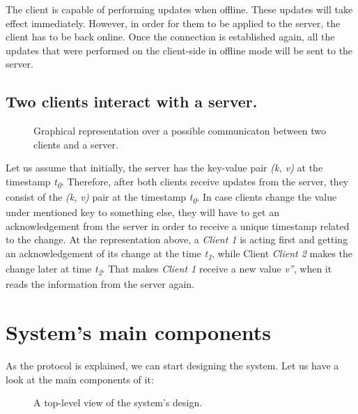 The client is capable of performing updates when offline. These updates will take effect immediately. However, in order for them to be applied to the server, the client has to be back online. Once the connection is established again, all the updates that were performed on the client-side in offline mode will be sent to the server.

\subsection{Two clients interact with a server.}

\begin{figure}[!htb]
    \begin{center}
    \def\svgwidth{\linewidth}
    
    \caption {Graphical representation over a possible communicaton between two clients and a server.}
    \label{fig:design4}
\end{center}
\end{figure}

Let us assume that initially, the server has the key-value pair \textit{(k, v)} at the timestamp \textit{t\textsubscript{0}}. Therefore, after both clients receive updates from the server, they consist of the \textit{(k, v)} pair at the timestamp \textit{t\textsubscript{0}}. In case clients change the value under mentioned key to something else, they will have to get an acknowledgement from the server in order to receive a unique timestamp related to the change. At the representation above, a \textit{Client 1} is acting first and getting an acknowledgement of its change at the time \textit{t\textsubscript{1}}, while Client \textit{Client 2} makes the change later at time \textit{t\textsubscript{2}}. That makes \textit{Client 1} receive a new value \textit{v''}, when it reads the information from the server again.

\section{System's main components}


As the protocol is explained, we can start designing the system. Let us have a look at the main components of it:


\begin{figure}[!htb]
    \begin{center}
        \setlength{\fboxsep}{15pt}%
        \setlength{\fboxrule}{1pt}%
    \def\svgwidth{\linewidth}
    \fbox{}
    \caption {A top-level view of the system's design.}
    \label{fig:design5}
\end{center}
\end{figure}

